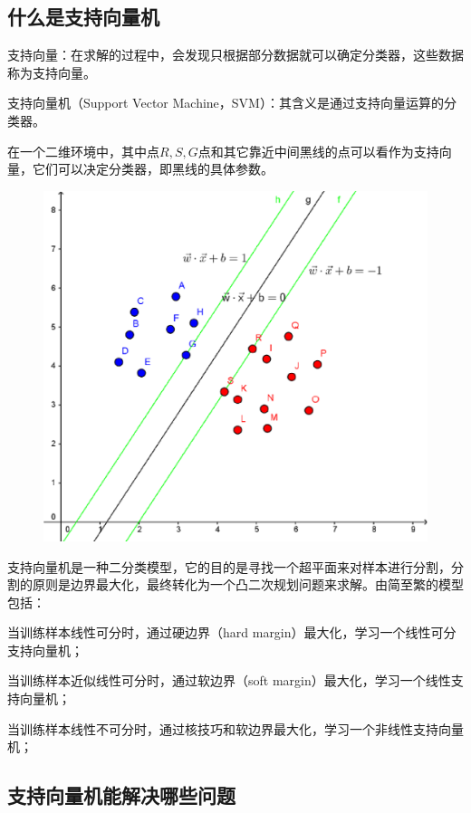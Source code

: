 \subsection{什么是支持向量机}

支持向量：在求解的过程中，会发现只根据部分数据就可以确定分类器，这些数据称为支持向量。

支持向量机（Support Vector Machine，SVM）：其含义是通过支持向量运算的分类器。

在一个二维环境中，其中点$R,S,G$点和其它靠近中间黑线的点可以看作为支持向量，它们可以决定分类器，即黑线的具体参数。

 \begin{figure}[h]
   \centering
   \includegraphics[width=.7\textwidth]{imgs/2-6.eps}
 \end{figure}

支持向量机是一种二分类模型，它的目的是寻找一个超平面来对样本进行分割，分割的原则是边界最大化，最终转化为一个凸二次规划问题来求解。由简至繁的模型包括：

当训练样本线性可分时，通过硬边界（hard margin）最大化，学习一个线性可分支持向量机；

当训练样本近似线性可分时，通过软边界（soft margin）最大化，学习一个线性支持向量机；

当训练样本线性不可分时，通过核技巧和软边界最大化，学习一个非线性支持向量机；

\subsection{支持向量机能解决哪些问题}

